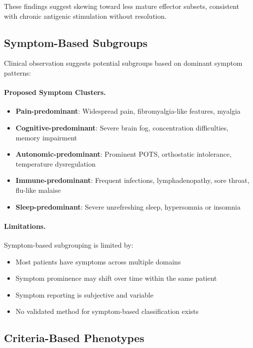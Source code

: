 These findings suggest skewing toward less mature effector subsets, consistent with chronic antigenic stimulation without resolution.

\subsection{Symptom-Based Subgroups}

Clinical observation suggests potential subgroups based on dominant symptom patterns:

\paragraph{Proposed Symptom Clusters.}
\begin{itemize}
    \item \textbf{Pain-predominant}: Widespread pain, fibromyalgia-like features, myalgia
    \item \textbf{Cognitive-predominant}: Severe brain fog, concentration difficulties, memory impairment
    \item \textbf{Autonomic-predominant}: Prominent POTS, orthostatic intolerance, temperature dysregulation
    \item \textbf{Immune-predominant}: Frequent infections, lymphadenopathy, sore throat, flu-like malaise
    \item \textbf{Sleep-predominant}: Severe unrefreshing sleep, hypersomnia or insomnia
\end{itemize}

\paragraph{Limitations.}
Symptom-based subgrouping is limited by:
\begin{itemize}
    \item Most patients have symptoms across multiple domains
    \item Symptom prominence may shift over time within the same patient
    \item Symptom reporting is subjective and variable
    \item No validated method for symptom-based classification exists
\end{itemize}

\subsection{Criteria-Based Phenotypes}

